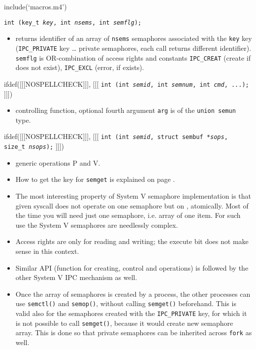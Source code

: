include(`macros.m4')


\begin{slide}
\texttt{int (key\_t \emph{key}, int \emph{\texttt{nsems}},
int \emph{\texttt{semflg}});}
\begin{itemize}
\item returns identifier of an array of \texttt{nsems} semaphores associated
with the \texttt{key} key (\texttt{IPC\_PRIVATE} key \dots{} private semaphores,
each call returns different identifier). 
\texttt{semflg} is OR-combination of access rights and constants
\texttt{IPC\_CREAT} (create if does not exist),
\texttt{IPC\_EXCL} (error, if exists). 
\end{itemize}
ifdef([[[NOSPELLCHECK]]], [[[
\texttt{int (int \emph{\texttt{semid}},
int \emph{\texttt{semnum}}, int \emph{\texttt{cmd}}, ...);}
]]])
\begin{itemize}
\item controlling function, optional fourth argument \texttt{arg} is of the
\texttt{union~semun} type.
\end{itemize}
ifdef([[[NOSPELLCHECK]]], [[[
\texttt{int (int \emph{\texttt{semid}},
struct sembuf *\emph{\texttt{sops}}, size\_t \emph{\texttt{nsops}});}
]]])
\begin{itemize}
\item generic operations P and V.
\end{itemize}
\end{slide}

\label{SYSVSEM}

\begin{itemize}
\item How to get the key for \texttt{semget} is explained on page
\pageref{FTOK}.
\item The most interesting property of System V semaphore implementation is
that given syscall does not operate on one semaphore but on , atomically.
Most of the time you will need just one semaphore, i.e. array of one item.
For such use the System V semaphores are needlessly complex.
\item Access rights are only for reading and writing; the execute bit does not
make sense in this context.
\item Similar API (function for creating, control and operations) is followed by
the other System V IPC mechanism as well.
\item Once the array of semaphores is created by a process, the other processes
can use \texttt{semctl()} and \texttt{semop()}, without calling
\texttt{semget()} beforehand. This is valid also for the semaphores created with
the \texttt{IPC\_PRIVATE} key, for which it is not possible to call
\texttt{semget()}, because it would create new semaphore array. This is done so
that private semaphores can be inherited across \texttt{fork} as well.
\end{itemize}

